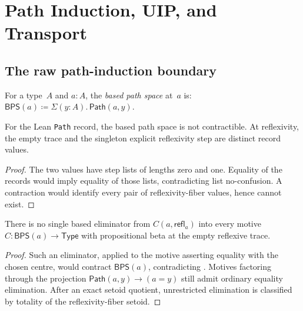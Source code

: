 \documentclass[manuscript]{BSLstyle}
\newcommand{\Path}{\mathsf{Path}}
\newcommand{\refl}{\mathsf{refl}}
\newcommand{\Type}{\mathsf{Type}}
\newcommand{\defeq}{\coloneqq}
\begin{document}
\section{Path Induction, UIP, and Transport}\label{sec:j-uip}

\subsection{The raw path-induction boundary}

\begin{definition}\label{def:based-path-space}
For a type~$A$ and $a : A$, the \emph{based path space} at~$a$ is:
$\mathsf{BPS}(a) \defeq \Sigma(y : A).\, \Path(a, y)$.
\end{definition}

\begin{theorem}\label{thm:contractibility}
For the Lean \texttt{Path} record, the based path space is not contractible.  At
reflexivity, the empty trace and the singleton explicit reflexivity step are
distinct record values.
\end{theorem}

\begin{proof}
The two values have step lists of lengths zero and one.  Equality of the
records would imply equality of those lists, contradicting list
no-confusion.  A contraction would identify every pair of reflexivity-fiber
values, hence cannot exist.
\end{proof}

\begin{theorem}\label{thm:J}
There is no single based eliminator from \(C(a,\refl_a)\) into every motive
\(C:\mathsf{BPS}(a)\to\Type\) with propositional beta at the empty reflexive
trace.
\end{theorem}

\begin{proof}
Such an eliminator, applied to the motive asserting equality with the chosen
centre, would contract \(\mathsf{BPS}(a)\), contradicting
.  Motives factoring through the projection
\(\Path(a,y)\to(a=y)\) still admit ordinary equality elimination.  After an
exact setoid quotient, unrestricted elimination is classified by totality of
the reflexivity-fiber setoid.
\end{proof}
\end{document}
